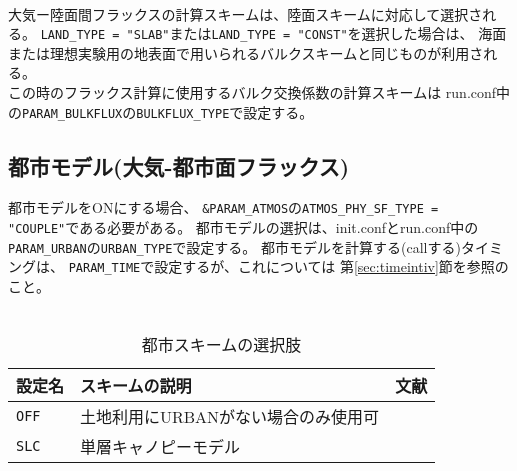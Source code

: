 \\

大気ー陸面間フラックスの計算スキームは、陸面スキームに対応して選択される。
\verb|LAND_TYPE = "SLAB"|または\verb|LAND_TYPE = "CONST"|を選択した場合は、
海面または理想実験用の地表面で用いられるバルクスキームと同じものが利用される。\\

この時のフラックス計算に使用するバルク交換係数の計算スキームは
run.conf中の\verb|PARAM_BULKFLUX|の\verb|BULKFLUX_TYPE|で設定する。\\



\subsection{都市モデル(大気-都市面フラックス)} \label{sec:basic_urban}
都市モデルをONにする場合、
\verb|&PARAM_ATMOS|の\verb|ATMOS_PHY_SF_TYPE = "COUPLE"|である必要がある。
都市モデルの選択は、init.confとrun.conf中の
\verb|PARAM_URBAN|の\verb|URBAN_TYPE|で設定する。
都市モデルを計算する(callする)タイミングは、
\verb|PARAM_TIME|で設定するが、これについては
第\ref{sec:timeintiv}節を参照のこと。\\

\\

\begin{table}[h]
\begin{center}
  \caption{都市スキームの選択肢}
  \label{tab:nml_urban}
  \begin{tabularx}{150mm}{llX} \hline
    \rowcolor[gray]{0.9}  設定名 & スキームの説明 & 文献\\ \hline
      \verb|OFF|  & 土地利用にURBANがない場合のみ使用可 &   \\
      \verb|SLC|  & 単層キャノピーモデル   & \citet{kusaka_2001} \\
    \hline
  \end{tabularx}
\end{center}
\end{table}

